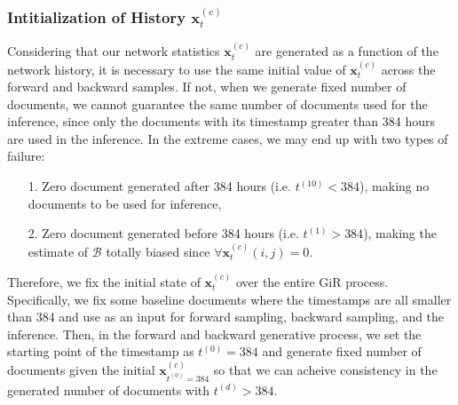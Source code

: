 \documentclass[a4paper]{article}
\begin{document}
        \subsubsection{Intitialization of History $\boldsymbol{x}_t^{(c)}$} \label{subsubsec: Initial history issue}
        Considering that our network statistics $\boldsymbol{x}_t^{(c)}$ are generated as a function of the network history, it is necessary to use the same initial value of $\boldsymbol{x}_t^{(c)}$ across the forward and backward samples. If not, when we generate fixed number of documents, we cannot guarantee the same number of documents used for the inference, since only the documents with its timestamp greater than 384 hours are used in the inference. In the extreme cases, we may end up with two types of failure:
        \begin{itemize}
        	\item[1.] Zero document generated after 384 hours (i.e. $t^{(10)} < 384$), making no documents to be used for inference,
        	\item[2.] Zero document generated before 384 hours (i.e. $t^{(1)} > 384$), making the estimate of $\mathcal{B}$ totally biased since $\forall  \boldsymbol{x}_t^{(c)}(i, j) = 0$. 
        \end{itemize}
        Therefore, we fix the initial state of $\boldsymbol{x}_t^{(c)}$ over the entire GiR process. Specifically, we fix some baseline documents where the timestamps are all smaller than 384 and use as an input for forward sampling, backward sampling, and the inference. Then, in the forward and backward generative process, we set the starting point of the timestamp as $t^{(0)} = 384$ and generate fixed number of documents given the initial $\boldsymbol{x}_{t^{(0)} = 384}^{(c)}$ so that we can acheive consistency in the generated number of documents with $t^{(d)} > 384$.
\end{document}
